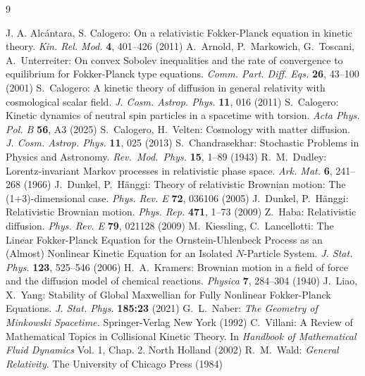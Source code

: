 \documentclass[12pt]{article}
\theoremstyle{definition}
\numberwithin{equation}{section}
\begin{document}
\begin{thebibliography}{9}

 J. A. Alc\'antara, S. Calogero: On a relativistic Fokker-Planck equation in kinetic theory. \textit{Kin. Rel. Mod.} \textbf{4}, 401--426 (2011)
 A.~Arnold, P.~Markowich, G.~Toscani, A.~Unterreiter: On convex Sobolev inequalities and the rate of convergence to equilibrium for Fokker-Planck type equations. \textit{Comm. Part. Diff. Eqs.} {\bf 26}, 43--100 (2001)
 S.~Calogero: A kinetic theory of diffusion in general relativity with cosmological scalar field. \textit{J. Cosm. Astrop. Phys.} \textbf{11}, 016 (2011)
 S.~Calogero: Kinetic dynamics of neutral spin particles in a spacetime with torsion. \textit{Acta Phys. Pol. B} {\bf 56}, A3 (2025)
 S.~Calogero, H.~Velten: Cosmology with matter diffusion. \textit{J. Cosm. Astrop. Phys.} {\bf 11}, 025 (2013) 
 S.~Chandrasekhar: Stochastic Problems in Physics and Astronomy. \textit{Rev.~Mod.~Phys.} \textbf{15}, 1--89 (1943)
 R.~M.~Dudley: Lorentz-invariant Markov processes in relativistic phase space. \textit{Ark. Mat.} {\bf 6}, 241--268 (1966)
 J.~Dunkel, P.~Hänggi: Theory of relativistic Brownian motion: The (1+3)-dimensional case. \textit{Phys. Rev. E} \textbf{72}, 036106 (2005)
 J.~Dunkel, P.~Hänggi: Relativistic Brownian motion. \textit{Phys. Rep.} {\bf 471}, 1--73 (2009)
 Z.~Haba: Relativistic diffusion.  \textit{Phys. Rev. E} {\bf 79}, 021128 (2009)
 M.~Kiessling, C.~Lancellotti: The Linear Fokker-Planck Equation for the Ornstein-Uhlenbeck Process as an (Almost) Nonlinear Kinetic Equation for an Isolated $N$-Particle System. \textit{J. Stat. Phys.} \textbf{123}, 525--546 (2006)
 H.~A.~Kramers: Brownian motion in a field of force and the diffusion model of chemical reactions. \textit{Physica} \textbf{7}, 284--304 (1940)
 J.~Liao, X.~Yang: Stability of Global Maxwellian for Fully Nonlinear Fokker-Planck Equations. \textit{J. Stat. Phys.} \textbf{185:23} (2021) 
 G.~L.~Naber: \textit{The Geometry of Minkowski Spacetime.} Springer-Verlag New York (1992) 
 C.~Villani: A Review of Mathematical Topics in Collisional Kinetic Theory. In {\it Handbook of Mathematical Fluid Dynamics} Vol. 1, Chap. 2. North Holland (2002)
 R.~M.~Wald: {\it General Relativity}. The University of Chicago Press (1984)




\end{thebibliography}
\end{document}
